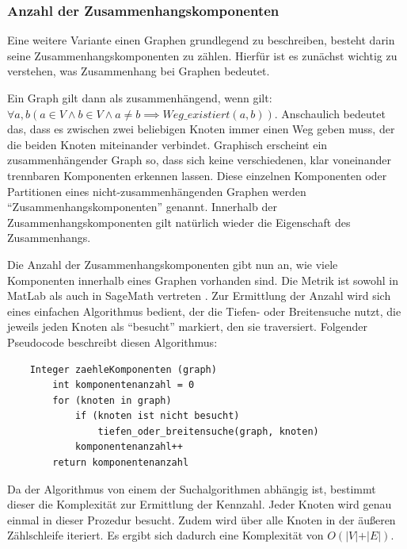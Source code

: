 \documentclass[a4paper,12pt,ngerman,chapterprefix=false,listof=totoc,bibliography=totoc]{scrreprt}
\begin{document}
\subsubsection*{Anzahl der Zusammenhangskomponenten}
{
Eine weitere Variante einen Graphen grundlegend zu beschreiben, besteht darin seine Zusammenhangskomponenten zu zählen. Hierfür ist es zunächst wichtig zu verstehen, was Zusammenhang bei Graphen bedeutet.

Ein Graph gilt dann als zusammenhängend, wenn gilt: \(\forall a, b(a\in V \land b\in V \land a\neq b \implies Weg\_existiert(a, b))\). Anschaulich bedeutet das, dass es zwischen zwei beliebigen Knoten immer einen Weg geben muss, der die beiden Knoten miteinander verbindet. Graphisch erscheint ein zusammenhängender Graph so, dass sich keine verschiedenen, klar voneinander trennbaren Komponenten erkennen lassen. Diese einzelnen Komponenten oder Partitionen eines nicht-zusammenhängenden Graphen werden "`Zusammenhangskomponenten"' genannt. Innerhalb der Zusammenhangskomponenten gilt natürlich wieder die Eigenschaft des Zusammenhangs. \cite{diestel_graphentheorie_2000}

Die Anzahl der Zusammenhangskomponenten gibt nun an, wie viele Komponenten innerhalb eines Graphen vorhanden sind. Die Metrik ist sowohl in MatLab als auch in SageMath vertreten \cite{sagemath_graph_2020,matlab_graph_2020}. Zur Ermittlung der Anzahl wird sich eines einfachen Algorithmus bedient, der die Tiefen- oder Breitensuche nutzt, die jeweils jeden Knoten als "`besucht"' markiert, den sie traversiert. Folgender Pseudocode beschreibt diesen Algorithmus:
\begin{lstlisting}
	Integer zaehleKomponenten (graph)
		int komponentenanzahl = 0
		for (knoten in graph)
			if (knoten ist nicht besucht)
				tiefen_oder_breitensuche(graph, knoten)
			komponentenanzahl++
		return komponentenanzahl
\end{lstlisting}
Da der Algorithmus von einem der Suchalgorithmen abhängig ist, bestimmt dieser die Komplexität zur Ermittlung der Kennzahl. Jeder Knoten wird genau einmal in dieser Prozedur besucht. Zudem wird über alle Knoten in der äußeren Zählschleife iteriert. Es ergibt sich dadurch eine Komplexität von \(O(\vert V\vert +\vert E\vert)\).
}
\end{document}
